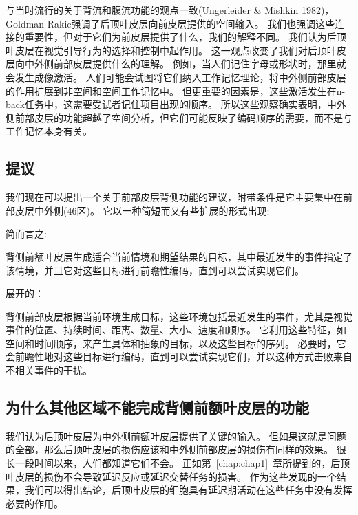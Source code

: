 与当时流行的关于背流和腹流功能的观点一致(Ungerleider \& Mishkin 1982)， Goldman-Rakic强调了后顶叶皮层向前皮层提供的空间输入\cite{wilson1993dissociation}。
我们也强调这些连接的重要性，但对于它们为前皮层提供了什么，我们的解释不同。
我们认为后顶叶皮层在视觉引导行为的选择和控制中起作用\cite{shadmehr2004computational,milner2006visual}。
这一观点改变了我们对后顶叶皮层向中外侧前部皮层提供什么的理解\cite{rushworth2000anatomical}。
例如，当人们记住字母或形状时，那里就会发生成像激活\cite{rushworth1998functional}。
人们可能会试图将它们纳入工作记忆理论，将中外侧前部皮层的作用扩展到非空间和空间工作记忆中。
但更重要的因素是，这些激活发生在n-back任务中，这需要受试者记住项目出现的顺序\cite{nystrom2000working}。
所以这些观察确实表明，中外侧前部皮层的功能超越了空间分析，但它们可能反映了编码顺序的需要，而不是与工作记忆本身有关。



\subsection{提议}

我们现在可以提出一个关于前部皮层背侧功能的建议，附带条件是它主要集中在前部皮层中外侧(46区)。
它以一种简短而又有些扩展的形式出现:

简而言之:

背侧前额叶皮层生成适合当前情境和期望结果的目标，其中最近发生的事件指定了该情境，并且它对这些目标进行前瞻性编码，直到可以尝试实现它们。


展开的：

背侧前部皮层根据当前环境生成目标，这些环境包括最近发生的事件，尤其是视觉事件的位置、持续时间、距离、数量、大小、速度和顺序。
它利用这些特征，如空间和时间顺序，来产生具体和抽象的目标，以及这些目标的序列。
必要时，它会前瞻性地对这些目标进行编码，直到可以尝试实现它们，并以这种方式击败来自不相关事件的干扰。



\subsection{为什么其他区域不能完成背侧前额叶皮层的功能}

我们认为后顶叶皮层为中外侧前额叶皮层提供了关键的输入。
但如果这就是问题的全部，那么后顶叶皮层的损伤应该和中外侧前部皮层的损伤有同样的效果。
很长一段时间以来，人们都知道它们不会。
正如第~\ref{chap:chap1}~章所提到的，后顶叶皮层的损伤不会导致延迟反应\cite{alexander1973effects}或延迟交替\cite{ettlinger1966tactile}任务的损害。
作为这些发现的一个结果，我们可以得出结论，后顶叶皮层的细胞具有延迟期活动\cite{kalaska1995deciding,snyder2000intention}在这些任务中没有发挥必要的作用。


